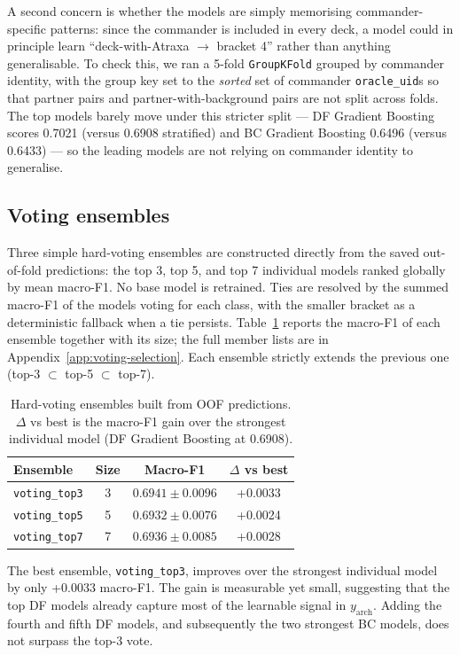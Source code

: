 \documentclass{article}
\begin{document}
A second concern is whether the models are simply memorising commander-specific patterns: since the commander is included in every deck, a model could in principle learn ``deck-with-Atraxa $\to$ bracket 4'' rather than anything generalisable. To check this, we ran a 5-fold \texttt{GroupKFold} grouped by commander identity, with the group key set to the \textit{sorted} set of commander \texttt{oracle\_uid}s so that partner pairs and partner-with-background pairs are not split across folds. The top models barely move under this stricter split --- DF Gradient Boosting scores 0.7021 (versus 0.6908 stratified) and BC Gradient Boosting 0.6496 (versus 0.6433) --- so the leading models are not relying on commander identity to generalise.

\subsection{Voting ensembles}
\label{sec:training:voting}

Three simple hard-voting ensembles are constructed directly from the saved out-of-fold predictions: the top 3, top 5, and top 7 individual models ranked globally by mean macro-F1. No base model is retrained. Ties are resolved by the summed macro-F1 of the models voting for each class, with the smaller bracket as a deterministic fallback when a tie persists. Table~\ref{tab:voting-results} reports the macro-F1 of each ensemble together with its size; the full member lists are in Appendix~\ref{app:voting-selection}. Each ensemble strictly extends the previous one (top-3 $\subset$ top-5 $\subset$ top-7).

\begin{table}[h]
\centering
\caption{Hard-voting ensembles built from OOF predictions. $\Delta$ vs best is the macro-F1 gain over the strongest individual model (DF Gradient Boosting at 0.6908).}
\label{tab:voting-results}
\small
\begin{tabular}{lccc}
\toprule
Ensemble & Size & Macro-F1 & $\Delta$ vs best \\
\midrule
\texttt{voting\_top3} & 3 & \(0.6941 \pm 0.0096\) & +0.0033 \\
\texttt{voting\_top5} & 5 & \(0.6932 \pm 0.0076\) & +0.0024 \\
\texttt{voting\_top7} & 7 & \(0.6936 \pm 0.0085\) & +0.0028 \\
\bottomrule
\end{tabular}
\end{table}

The best ensemble, \texttt{voting\_top3}, improves over the strongest individual model by only +0.0033 macro-F1. The gain is measurable yet small, suggesting that the top DF models already capture most of the learnable signal in \(y_{\text{arch}}\). Adding the fourth and fifth DF models, and subsequently the two strongest BC models, does not surpass the top-3 vote.
\end{document}
